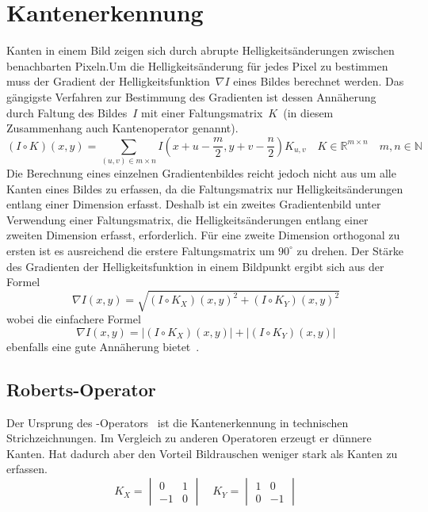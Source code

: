 \section{Kantenerkennung}
\label{sec:edge-detection}
\writtenby{\dcauthornameewie}%
Kanten in einem Bild zeigen sich durch abrupte Helligkeitsänderungen zwischen benachbarten Pixeln.Um die Helligkeitsänderung für jedes Pixel zu bestimmen muss der Gradient der Helligkeitsfunktion~$\nabla I$ eines Bildes berechnet werden.
Das gängigste Verfahren zur Bestimmung des Gradienten ist dessen Annäherung durch Faltung des Bildes~$I$ mit einer Faltungsmatrix~$K$~(in diesem Zusammenhang auch Kantenoperator genannt).
\begin{equation}
  (I\circ K)(x,y) =
       \sum_{(u,v)\in m\times n}
       I\left(x+u-\frac{m}{2},y+v-\frac{n}{2}\right)K_{u,v}
       \quad K\in\mathbb{R}^{m\times n}
       \quad m,n \in\mathbb{N}
\end{equation}
Die Berechnung eines einzelnen Gradientenbildes reicht jedoch nicht aus um alle Kanten eines Bildes zu erfassen, da die Faltungsmatrix nur Helligkeitsänderungen entlang einer Dimension erfasst.
Deshalb ist ein zweites Gradientenbild unter Verwendung einer Faltungsmatrix, die Helligkeitsänderungen entlang einer zweiten Dimension erfasst, erforderlich.
Für eine zweite Dimension orthogonal zu ersten ist es ausreichend die erstere Faltungsmatrix um $90^\circ$ zu drehen.
Der Stärke des Gradienten der Helligkeitsfunktion in einem Bildpunkt ergibt sich aus der Formel
\begin{equation}
  \nabla I(x,y) = \sqrt{(I \circ K_X)(x,y)^2 + (I \circ K_Y)(x,y)^2}
\end{equation}
wobei die einfachere Formel
\begin{equation}
  \nabla I(x,y) = |(I \circ K_X)(x,y)| + |(I \circ K_Y)(x,y)|
\end{equation}
ebenfalls eine gute Annäherung bietet~\cite[Kapitel~5.2]{davies2012}.

\subsection*{Roberts-Operator}
Der Ursprung des -Operators~\cite[S.~26]{roberts1963} ist die Kantenerkennung in technischen Strichzeichnungen.
Im Vergleich zu anderen Operatoren erzeugt er dünnere Kanten.
Hat dadurch aber den Vorteil Bildrauschen weniger stark als Kanten zu erfassen.
\begin{equation}
  K_X = \begin{vmatrix}
     0 & 1 \\
    -1 & 0
  \end{vmatrix}
  \quad
  K_Y = \begin{vmatrix}
    1 &  0 \\
    0 & -1
  \end{vmatrix}
\end{equation}

